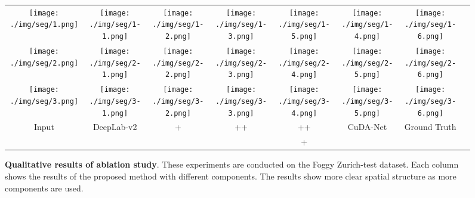 \documentclass[10pt,twocolumn,letterpaper]{article}
\begin{document}
\begin{figure*}[!ht]
\centering
		\tabcolsep=0.5pt
		\renewcommand\arraystretch{0.5}
		\begin{tabular}{cccccccc}
			\texttt{[image: ./img/seg/1.png]} &
			\texttt{[image: ./img/seg/1-1.png]} &
			\texttt{[image: ./img/seg/1-2.png]} &
			\texttt{[image: ./img/seg/1-3.png]} &
			\texttt{[image: ./img/seg/1-5.png]} &
			\texttt{[image: ./img/seg/1-4.png]} &
			\texttt{[image: ./img/seg/1-6.png]}\\
			\texttt{[image: ./img/seg/2.png]} &
			\texttt{[image: ./img/seg/2-1.png]} &
			\texttt{[image: ./img/seg/2-2.png]} &
			\texttt{[image: ./img/seg/2-3.png]} &
			\texttt{[image: ./img/seg/2-4.png]} &
			\texttt{[image: ./img/seg/2-5.png]} &
			\texttt{[image: ./img/seg/2-6.png]}\\
			\texttt{[image: ./img/seg/3.png]} &
			\texttt{[image: ./img/seg/3-1.png]} &
			\texttt{[image: ./img/seg/3-2.png]} &
			\texttt{[image: ./img/seg/3-3.png]} &
			\texttt{[image: ./img/seg/3-4.png]} &
			\texttt{[image: ./img/seg/3-5.png]} &
			\texttt{[image: ./img/seg/3-6.png]}\\
			Input & DeepLab-v2 & 
			\small{+} & \small{++} & \small{++} & CuDA-Net  & Ground Truth \\
			\scriptsize{} & \scriptsize{} & 
			\scriptsize{} & \scriptsize{} & \small{+} 
			& \scriptsize{} & \scriptsize{} \\
	\end{tabular}
	\vspace{-2mm}
	\caption{
\textbf{Qualitative results of ablation study}.
	These experiments are conducted on the Foggy Zurich-test dataset. Each column shows the results of the proposed method with different components. 
	The results show more clear spatial structure as more components are used.}
	\vspace{-4mm}
	\label{fig:ablation}
\end{figure*}
\end{document}
